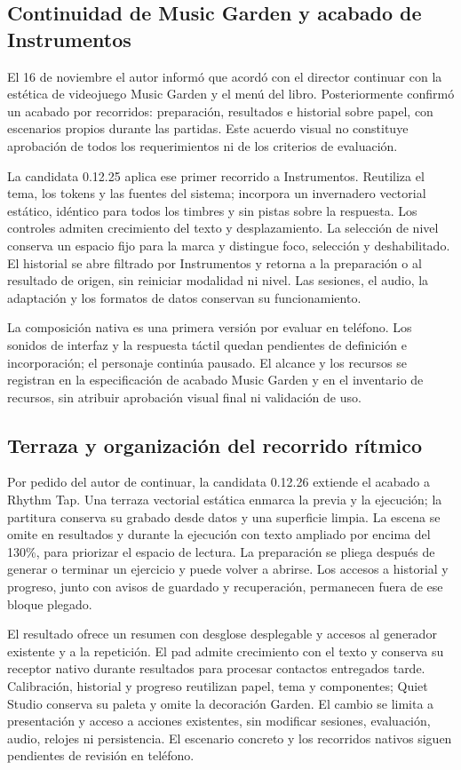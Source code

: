 \subsection{Continuidad de Music Garden y acabado de Instrumentos}
El 16 de noviembre el autor informó que acordó con el director continuar con
la estética de videojuego Music Garden y el menú del libro. Posteriormente
confirmó un acabado por recorridos: preparación, resultados e historial sobre
papel, con escenarios propios durante las partidas. Este acuerdo visual no
constituye aprobación de todos los requerimientos ni de los criterios de evaluación.

La candidata 0.12.25 aplica ese primer recorrido a Instrumentos. Reutiliza el
tema, los tokens y las fuentes del sistema; incorpora un invernadero vectorial
estático, idéntico para todos los timbres y sin pistas sobre la respuesta. Los
controles admiten crecimiento del texto y desplazamiento. La selección de nivel
conserva un espacio fijo para la marca y distingue foco, selección y deshabilitado.
El historial se abre filtrado por Instrumentos y retorna a la preparación o al
resultado de origen, sin reiniciar modalidad ni nivel. Las sesiones, el audio,
la adaptación y los formatos de datos conservan su funcionamiento.

La composición nativa es una primera versión por evaluar en teléfono. Los
sonidos de interfaz y la respuesta táctil quedan pendientes de definición e
incorporación; el personaje continúa pausado. El alcance y los recursos se
registran en la especificación de acabado Music Garden y en el inventario de
recursos, sin atribuir aprobación visual final ni validación de uso.

\subsection{Terraza y organización del recorrido rítmico}
Por pedido del autor de continuar, la candidata 0.12.26 extiende el acabado a
Rhythm Tap. Una terraza vectorial estática enmarca la previa y la ejecución;
la partitura conserva su grabado desde datos y una superficie limpia. La escena
se omite en resultados y durante la ejecución con texto ampliado por encima del
130\%, para priorizar el espacio de lectura. La preparación se pliega después
de generar o terminar un ejercicio y puede volver a abrirse. Los accesos a
historial y progreso, junto con avisos de guardado y recuperación, permanecen
fuera de ese bloque plegado.

El resultado ofrece un resumen con desglose desplegable y accesos al generador
existente y a la repetición. El pad admite crecimiento con el texto y conserva
su receptor nativo durante resultados para procesar contactos entregados tarde.
Calibración, historial y progreso reutilizan papel, tema y componentes; Quiet
Studio conserva su paleta y omite la decoración Garden. El cambio se limita a
presentación y acceso a acciones existentes, sin modificar sesiones, evaluación,
audio, relojes ni persistencia. El escenario concreto y los recorridos nativos
siguen pendientes de revisión en teléfono.

